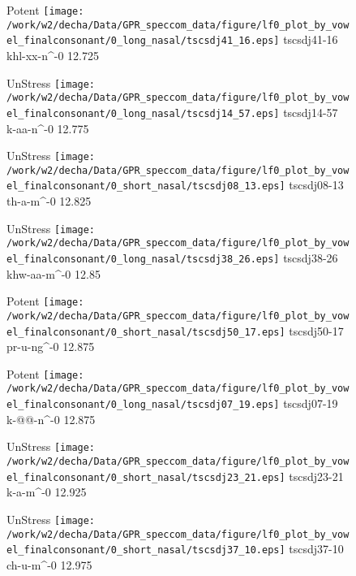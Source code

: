 \documentclass{article}
\begin{document}
\begin{figure}[t]
\begin{minipage}[b]{.24\textwidth}
\colorbox{Apricot}{Potent}
\centering
\texttt{[image: /work/w2/decha/Data/GPR\_speccom\_data/figure/lf0\_plot\_by\_vowel\_finalconsonant/0\_long\_nasal/tscsdj41\_16.eps]}
tscsdj41-16 khl-xx-n\textasciicircum-0 12.725
\end{minipage}
\begin{minipage}[b]{.24\textwidth}
UnStress
\centering
\texttt{[image: /work/w2/decha/Data/GPR\_speccom\_data/figure/lf0\_plot\_by\_vowel\_finalconsonant/0\_long\_nasal/tscsdj14\_57.eps]}
tscsdj14-57 k-aa-n\textasciicircum-0 12.775
\end{minipage}
\begin{minipage}[b]{.24\textwidth}
UnStress
\centering
\texttt{[image: /work/w2/decha/Data/GPR\_speccom\_data/figure/lf0\_plot\_by\_vowel\_finalconsonant/0\_short\_nasal/tscsdj08\_13.eps]}
tscsdj08-13 th-a-m\textasciicircum-0 12.825
\end{minipage}
\begin{minipage}[b]{.24\textwidth}
UnStress
\centering
\texttt{[image: /work/w2/decha/Data/GPR\_speccom\_data/figure/lf0\_plot\_by\_vowel\_finalconsonant/0\_long\_nasal/tscsdj38\_26.eps]}
tscsdj38-26 khw-aa-m\textasciicircum-0 12.85
\end{minipage}
\end{figure}
\clearpage
\begin{figure}[t]
\begin{minipage}[b]{.24\textwidth}
\colorbox{Apricot}{Potent}
\centering
\texttt{[image: /work/w2/decha/Data/GPR\_speccom\_data/figure/lf0\_plot\_by\_vowel\_finalconsonant/0\_short\_nasal/tscsdj50\_17.eps]}
tscsdj50-17 pr-u-ng\textasciicircum-0 12.875
\end{minipage}
\begin{minipage}[b]{.24\textwidth}
\colorbox{Apricot}{Potent}
\centering
\texttt{[image: /work/w2/decha/Data/GPR\_speccom\_data/figure/lf0\_plot\_by\_vowel\_finalconsonant/0\_long\_nasal/tscsdj07\_19.eps]}
tscsdj07-19 k-@@-n\textasciicircum-0 12.875
\end{minipage}
\begin{minipage}[b]{.24\textwidth}
UnStress
\centering
\texttt{[image: /work/w2/decha/Data/GPR\_speccom\_data/figure/lf0\_plot\_by\_vowel\_finalconsonant/0\_short\_nasal/tscsdj23\_21.eps]}
tscsdj23-21 k-a-m\textasciicircum-0 12.925
\end{minipage}
\begin{minipage}[b]{.24\textwidth}
UnStress
\centering
\texttt{[image: /work/w2/decha/Data/GPR\_speccom\_data/figure/lf0\_plot\_by\_vowel\_finalconsonant/0\_short\_nasal/tscsdj37\_10.eps]}
tscsdj37-10 ch-u-m\textasciicircum-0 12.975
\end{minipage}
\end{figure}
\end{document}
